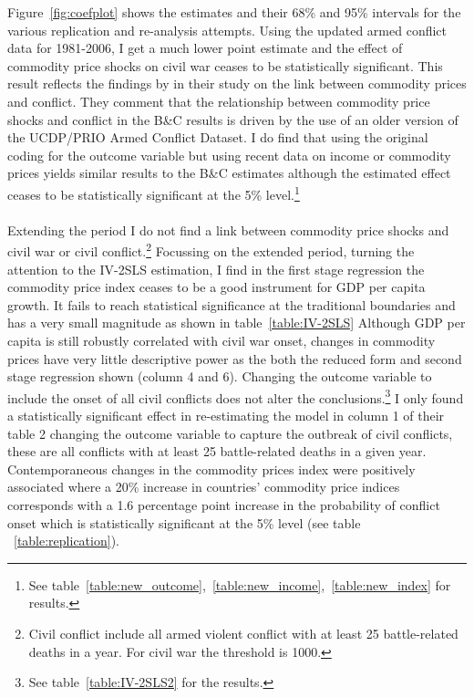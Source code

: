 \documentclass[a4paper,11pt]{article}
\begin{document}
Figure~\ref{fig:coefplot} shows the estimates and their 68\% and 95\% intervals for the various replication and re-analysis attempts.  
Using the updated armed conflict data for 1981-2006, I get a much lower point estimate and the effect of commodity price shocks on civil war ceases to be statistically significant. 
This result reflects the findings by \citet{Bazzi2014} in their study on the link between commodity prices and conflict.
They comment that the relationship between commodity price shocks and conflict in the B\&C results is driven by the use of an older version of the UCDP/PRIO Armed Conflict Dataset. 
I do find that using the original coding for the outcome variable but using recent data on income or commodity prices yields similar results to the B\&C estimates although the estimated effect ceases to be statistically significant at the 5\% level.\footnote{See table~\ref{table:new_outcome},~\ref{table:new_income},~\ref{table:new_index} for results.}\\\\
Extending the period I do not find a link between commodity price shocks and civil war or civil conflict.\footnote{Civil conflict include all armed violent conflict with at least 25 battle-related deaths in a year. For civil war the threshold is 1000.}
Focussing on the extended period, turning the attention to the IV-2SLS estimation, I find in the first stage regression the commodity price index ceases to be a good instrument for GDP per capita growth.
It fails to reach statistical significance at the traditional boundaries and has a very small magnitude as shown in table~\ref{table:IV-2SLS}
Although GDP per capita is still robustly correlated with civil war onset, changes in commodity prices have very little descriptive power as the both the reduced form and second stage regression shown (column 4 and 6).
Changing the outcome variable to include the onset of all civil conflicts does not alter the conclusions.\footnote{See table~\ref{table:IV-2SLS2} for the results.}
I only found a statistically significant effect in re-estimating the model in column 1 of their table 2 changing the outcome variable to capture the outbreak of civil conflicts, these are all conflicts with at least 25 battle-related deaths in a given year. 
Contemporaneous changes in the commodity prices index were positively associated where a 20\% increase in countries' commodity price indices corresponds with a 1.6 percentage point increase in the probability of conflict onset which is statistically significant at the 5\% level (see table ~\ref{table:replication}).
\end{document}
